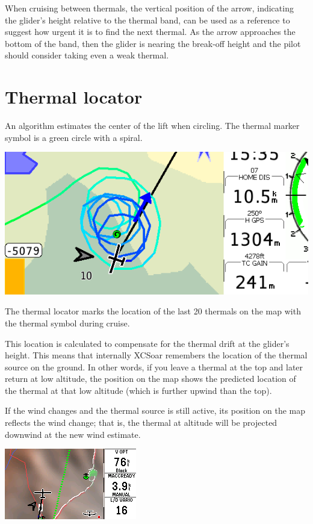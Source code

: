 When cruising between thermals, the vertical position of the arrow,
indicating the glider's height relative to the thermal band, can be
used as a reference to suggest how urgent it is to find the next
thermal.  As the arrow approaches the bottom of the band, then the
glider is nearing the break-off height and the pilot should consider
taking even a weak thermal.

\section{Thermal locator}
An algorithm estimates the center of the lift when circling.  The
thermal marker symbol is a green circle with a spiral.

\begin{center}
\includegraphics[angle=0,width=0.8\linewidth,keepaspectratio='true']{figures/shot-tlocator-circling.png}
\end{center}

The thermal locator marks the location of the last 20 
thermals on the map with the thermal symbol during cruise.

This location is calculated to compensate for the thermal drift at 
the glider's height.  This means that internally XCSoar remembers 
the location of the thermal source on the ground.  In other words, 
if you leave a thermal at the top and later return at low altitude, 
the position on the map shows the predicted location of the thermal 
at that low altitude (which is further upwind than the top).  

If the wind changes and the thermal source is still active, its 
position on the map reflects the wind change; that is, the thermal 
at altitude will be projected downwind at the new wind estimate.

\begin{center}
\includegraphics[angle=0,width=0.8\linewidth,keepaspectratio='true']{figures/shot-tlocator-cruise.png}
\end{center}


